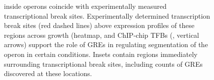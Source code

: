 \begin{figure}[hp]
{%
\DIFdelendFL inside operons coincide with experimentally measured transcriptional break sites. \DIFdelbeginFL %
\DIFdelendFL Experimentally determined transcription break sites (red dashed lines) above expression profiles of these regions across growth (heatmap, \DIFdelbeginFL {}\DIFdelendFL \DIFaddbeginFL {}\DIFaddendFL and ChIP-chip TFBs (\DIFdelbeginFL {}\DIFdelendFL \DIFaddbeginFL {}\DIFaddendFL , \DIFdelbeginFL {}\DIFdelendFL vertical arrows) support the role of GREs in regulating segmentation of the operon in certain conditions. Insets contain regions immediately surrounding transcriptional break sites, including counts of GREs discovered at these locations.\DIFdelbeginFL {}%
\DIFdelendFL \DIFaddbeginFL }
\label{fig:nirH}
\end{figure}

